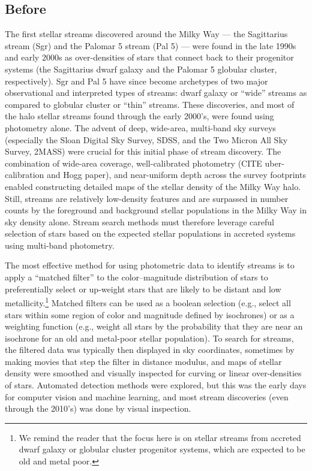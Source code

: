 \documentclass[final,5p,times,twocolumn,authoryear]{elsarticle}
\begin{document}

\subsection{Before \gaia}

The first stellar streams discovered around the Milky Way --- the Sagittarius stream
(Sgr) and the Palomar 5 stream (Pal 5) --- were found in the late 1990s and early 2000s
as over-densities of stars that connect back to their progenitor systems (the
Sagittarius dwarf galaxy and the Palomar 5 globular cluster, respectively).
Sgr and Pal 5 have since become archetypes of two major observational and interpreted
types of streams: dwarf galaxy or ``wide'' streams as compared to globular cluster or
``thin'' streams.
These discoveries, and most of the halo stellar streams found through the early 2000's,
were found using photometry alone.
The advent of deep, wide-area, multi-band sky surveys (especially the Sloan Digital Sky
Survey, SDSS, and the Two Micron All Sky Survey, 2MASS) were crucial for this initial
phase of stream discovery.
The combination of wide-area coverage, well-calibrated photometry (CITE uber-calibration
and Hogg paper), and near-uniform depth across the survey footprints enabled
constructing detailed maps of the stellar density of the Milky Way halo.
Still, streams are relatively low-density features and are surpassed in number counts by
the foreground and background stellar populations in the Milky Way in sky density alone.
Stream search methods must therefore leverage careful selection of stars based on the
expected stellar populations in accreted systems using multi-band photometry.

The most effective method for using photometric data to identify streams is to apply a
``matched filter'' \citep{Rockosi:2002:MatchedFilterAnalysisTidal} to the color--magnitude distribution of stars
to preferentially select or up-weight stars that are likely to be distant and low
metallicity.\footnote{We remind the reader that the focus here is on stellar streams
from accreted dwarf galaxy or globular cluster progenitor systems, which are expected to
be old and metal poor.}
Matched filters can be used as a boolean selection (e.g., select all stars within some
region of color and magnitude defined by isochrones) or as a weighting function (e.g.,
weight all stars by the probability that they are near an isochrone for an old and
metal-poor stellar population).
To search for streams, the filtered data was typically then displayed in sky
coordinates, sometimes by making movies that step the filter in distance modulus, and
maps of stellar density were smoothed and visually inspected for curving or linear
over-densities of stars.
Automated detection methods were explored, but this was the early days for computer
vision and machine learning, and most stream discoveries (even through the 2010's) was
done by visual inspection.
\end{document}
